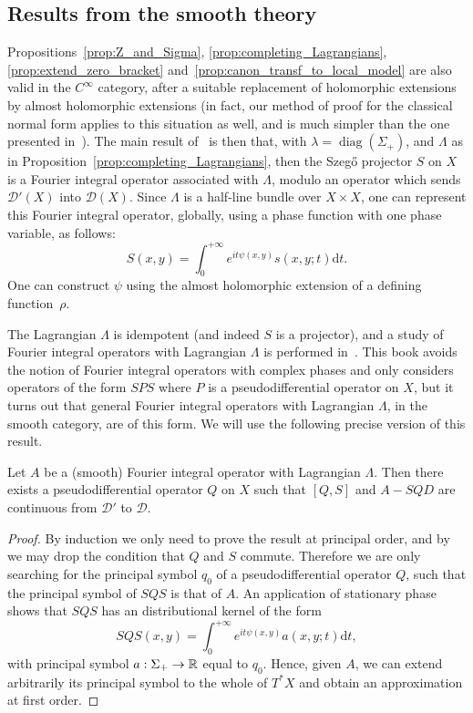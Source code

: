 \documentclass[10pt]{amsart}
\theoremstyle{definition}\newtheorem{defi}[theo]{Definition}\newtheorem{rema}[theo]{Remark}\newtheorem{exam}[theo]{Example}\newtheorem{exem}[theo]{Example}\newtheorem{nota}[theo]{Notation}
\DeclareMathOperator{\diag}{diag}
\newcommand{\clD}{\mathcal{D}}
\newcommand\1{\mathds{1}}
\newcommand{\R}{\mathbb{R}}
\newcommand{\dd}{\mathrm{d}}
\renewcommand*{\to}{\mathchoice{\longrightarrow}{\rightarrow}{\rightarrow}{\rightarrow}}
\begin{document}
\subsection{Results from the smooth theory}\label{sec:results-from-smooth}

Propositions~\ref{prop:Z_and_Sigma}, \ref{prop:completing_Lagrangians}, \ref{prop:extend_zero_bracket} and~\ref{prop:canon_transf_to_local_model} are also valid in the $C^{\infty}$ category, after a suitable replacement of holomorphic extensions by almost holomorphic extensions (in fact, our method of proof for the classical normal form applies to this situation as well, and is much simpler than the one presented in~\cite[Appendix~2]{boutet_de_monvel_hypoelliptic_1974}). The main result of~\cite{boutet_de_monvel_sur_1975} is then that, with $\lambda=\diag(\Sigma_+)$, and $\Lambda$ as in Proposition~\ref{prop:completing_Lagrangians}, then the Szeg\H{o} projector $S$ on $X$ is a {Fourier integral} operator associated with $\Lambda$, modulo an operator which sends $\clD'(X)$ into $\clD(X)$. Since $\Lambda$ is a half-line bundle over $X\times X$, one can represent this {Fourier integral} operator, globally, using a phase function with one phase variable, as follows:
\[
S(x,y)=\int_0^{+\infty}e^{it\psi(x,y)}s(x,y;t)\dd t.
\]
One can construct $\psi$ using the almost holomorphic extension of a defining function~$\rho$.

The {Lagrangian} $\Lambda$ is idempotent (and indeed $S$ is a projector), and a study of {Fourier integral operators} with {Lagrangian} $\Lambda$ is performed in~\cite{boutet_de_monvel_spectral_1981}. This book avoids the notion of {Fourier integral} operators with complex phases and only considers operators of the form $\mathit{SPS}$ where $P$ is a pseudodifferential operator on $X$, but it turns out that general {Fourier integral operators} with Lagrangian $\Lambda$, in the smooth category, are of this form. We will use the following precise version of this result.

\begin{prop}\label{prop:repr_BG_smooth}
Let $A$ be a (smooth) {Fourier integral} operator with {Lagrangian} $\Lambda$. Then there exists a pseudodifferential operator $Q$ on $X$ such that $[Q,S]$ and $A-SQD$ are continuous from $\clD'$ to $\clD$.
\end{prop}

\begin{proof}
By induction we only need to prove the result at principal order, and by~\cite[Proposition~2.13]{boutet_de_monvel_spectral_1981} we may drop the condition that $Q$ and $S$ commute. Therefore we are only searching for the principal symbol $q_0$ of a pseudodifferential operator $Q$, such that the principal symbol of $\mathit{SQS}$ is that of $A$. An application of stationary phase shows that $\mathit{SQS}$ has an distributional kernel of the form
\[
\mathit{SQS}(x,y)=\int_0^{+\infty}e^{it\psi(x,y)}a(x,y;t)\dd t,
\]
with principal symbol $a:\Sigma_+\to \R$ equal to $q_0$. Hence, given $A$, we can extend arbitrarily its principal symbol to the whole of $T^*X$ and obtain an approximation at first order.
\end{proof}
\end{document}
